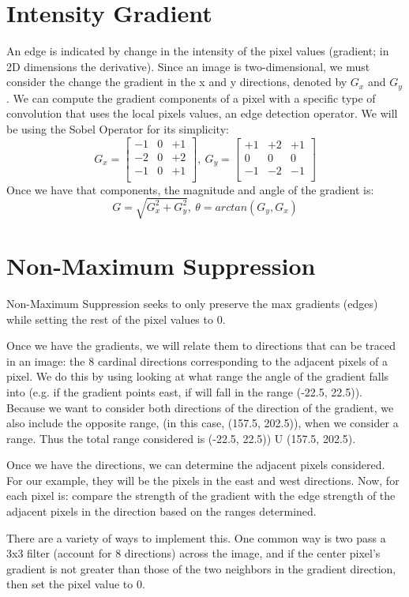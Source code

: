 \documentclass{article}
\begin{document}
\section{Intensity Gradient}
An edge is indicated by change in the intensity of the pixel values (gradient; in 2D dimensions the derivative). Since an image is two-dimensional, we must consider the change the gradient in the x and y directions, denoted by \(G_x\) and \(G_y\). We can compute the gradient components of a pixel with a specific type of convolution that uses the local pixels values, an edge detection operator. We will be using the Sobel Operator for its simplicity:
\[
G_x
=
\begin{bmatrix}
    -1&0&+1\\
    -2&0&+2\\
    -1&0&+1\\
\end{bmatrix}
,\  
G_y
=
\begin{bmatrix}
    +1&+2&+1\\
    0&0&0\\
    -1&-2&-1\\
\end{bmatrix}
\]
Once we have that components, the magnitude and angle of the gradient is:
\[
G = \sqrt{G_x^2 + G_y^2}, \
\theta = arctan(G_y, G_x)
\]
\section{Non-Maximum Suppression}
Non-Maximum Suppression seeks to only preserve the max gradients (edges) while setting the rest of the pixel values to 0. 
\par
Once we have the gradients, we will relate them to directions that can be traced in an image: the 8 cardinal directions corresponding to the adjacent pixels of a pixel. We do this by using looking at what range the angle of the gradient falls into (e.g. if the gradient points east, if will fall in the range (-22.5, 22.5)). Because we want to consider both directions of the direction of the gradient, we also include the opposite range, (in this case, (157.5, 202.5)), when we consider a range. Thus the total range considered is (-22.5, 22.5)) U (157.5, 202.5).
\par
Once we have the directions, we can determine the adjacent pixels considered. For our example, they will be the pixels in the east and west directions. Now, for each pixel is: compare the strength of the gradient with the edge strength of the adjacent pixels in the direction based on the ranges determined. 
\par
There are a variety of ways to implement this. One common way is two pass a 3x3 filter (account for 8 directions) across the image, and if the center pixel's gradient is not greater than those of the two neighbors in the gradient direction, then set the pixel value to 0.
\end{document}
